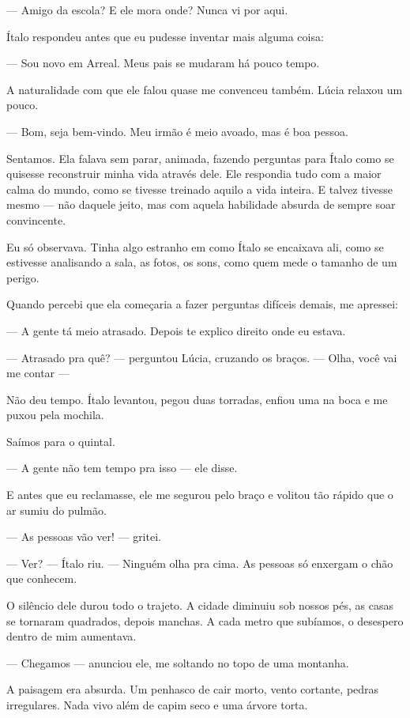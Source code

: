— Amigo da escola? E ele mora onde? Nunca vi por aqui.

Ítalo respondeu antes que eu pudesse inventar mais alguma coisa:

— Sou novo em Arreal. Meus pais se mudaram há pouco tempo.

A naturalidade com que ele falou quase me convenceu também. Lúcia relaxou um pouco.

— Bom, seja bem-vindo. Meu irmão é meio avoado, mas é boa pessoa.

Sentamos. Ela falava sem parar, animada, fazendo perguntas para Ítalo como se quisesse reconstruir minha vida através dele. Ele respondia tudo com a maior calma do mundo, como se tivesse treinado aquilo a vida inteira. E talvez tivesse mesmo — não daquele jeito, mas com aquela habilidade absurda de sempre soar convincente.

Eu só observava. Tinha algo estranho em como Ítalo se encaixava ali, como se estivesse analisando a sala, as fotos, os sons, como quem mede o tamanho de um perigo.

Quando percebi que ela começaria a fazer perguntas difíceis demais, me apressei:

— A gente tá meio atrasado. Depois te explico direito onde eu estava.

— Atrasado pra quê? — perguntou Lúcia, cruzando os braços. — Olha, você vai me contar —

Não deu tempo. Ítalo levantou, pegou duas torradas, enfiou uma na boca e me puxou pela mochila.

Saímos para o quintal.

— A gente não tem tempo pra isso — ele disse.

E antes que eu reclamasse, ele me segurou pelo braço e volitou tão rápido que o ar sumiu do pulmão.

— As pessoas vão ver! — gritei.

— Ver? — Ítalo riu. — Ninguém olha pra cima. As pessoas só enxergam o chão que conhecem.

O silêncio dele durou todo o trajeto. A cidade diminuiu sob nossos pés, as casas se tornaram quadrados, depois manchas. A cada metro que subíamos, o desespero dentro de mim aumentava.

— Chegamos — anunciou ele, me soltando no topo de uma montanha.

A paisagem era absurda. Um penhasco de cair morto, vento cortante, pedras irregulares. Nada vivo além de capim seco e uma árvore torta.

